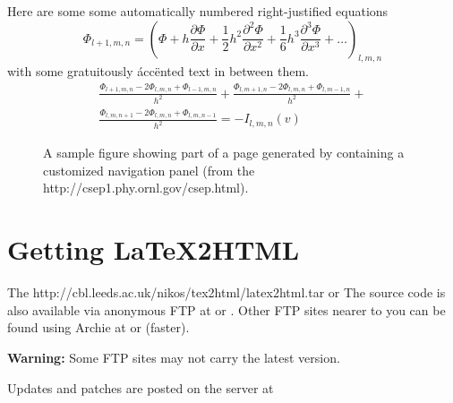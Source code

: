 Here are some some automatically numbered right-justified equations
\begin{equation} 
\Phi_{l+1,m,n} = (\Phi+h\frac{\partial\Phi}{\partial x} +
\frac{1}{2}h^2\frac{\partial^2\Phi}{\partial x^2} +
\frac{1}{6}h^3\frac{\partial^3\Phi}{\partial x^3} + \ldots)_{l,m,n}
\end{equation}
with some gratuitously \'{a}cc\"{e}nted text in between them.
\begin{eqnarray}  \label{eq:demo}
\frac{\Phi_{l+1,m,n}-2\Phi_{l,m,n}+\Phi_{l-1,m,n}}{h^{2}} +
\frac{\Phi_{l,m+1,n}-2\Phi_{l,m,n}+\Phi_{l,m-1,n}}{h^{2}} + \nonumber \\
\frac{\Phi_{l,m,n+1}-2\Phi_{l,m,n}+\Phi_{l,m,n-1}}{h^{2}} = -I_{l,m,n}(v)
\end{eqnarray}

{\begin{figure}[tbh]
    \centerline{
    }
    \caption{A sample figure showing part of a page generated by
\latextohtml containing a customized navigation panel (from the
\protect{}
{http://csep1.phy.ornl.gov/csep.html}).}
    \label{fig:example}
\end{figure}}

\section{Getting LaTeX2HTML}
\begin{flushleft}
The 
{http://cbl.leeds.ac.uk/nikos/tex2html/latex2html.tar}
or 
The source code is also available 
via anonymous FTP at 
or
.
Other FTP sites nearer to you can be found using {\fn Archie}
at
or 
(faster).

{\bf Warning:} Some FTP sites may not carry the latest version.

Updates and patches are posted on the \latextohtml server at

\end{flushleft}

